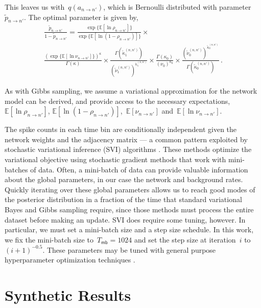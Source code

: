 This leaves us with~$q(a_{n \to n'})$, which is Bernoulli distributed
with parameter~$\widetilde{p}_{n \to n'}$. The optimal parameter is given by,
\begin{multline*}
  \frac{\widetilde{p}_{n \to n'}}{1-\widetilde{p}_{n \to n'}} =  
  \frac{\exp\{\mathbb{E} [\ln \rho_{n \to n'}] \} }{\exp\{\mathbb{E}[\ln (1-\rho_{n \to n'})] \}} \times \\
  \frac{ (\exp\{\mathbb{E} [\ln \nu_{n \to n'}] \})^{\kappa} }{ \Gamma(\kappa)} \times 
  \frac{\Gamma(\widetilde{\kappa}^{(n,n')}_1)}{ (\widetilde{\nu}^{(n,n')}_1)^{\widetilde{\kappa}^{(n,n')}_1} } \times
  \frac{\Gamma(\kappa_0)}{ (\nu_0)^{\kappa_0} } \times
  \frac{(\widetilde{\nu}^{(n,n')}_0)^{\widetilde{\kappa}^{(n,n')}_0}}{ \Gamma(\widetilde{\kappa}^{(n,n')}_0)}\,.
\end{multline*}

As with Gibbs sampling, we assume a variational approximation for the
network model can be derived, and provide access to the necessary
expectations,~$\mathbb{E}[\ln \rho_{n \to n'}]$,
$\mathbb{E}[\ln(1-\rho_{n \to n'})]$,~$\mathbb{E}[\nu_{n \to n'}]$ and~$\mathbb{E}[\ln \nu_{n \to n'}]$.

The spike counts in each time bin are conditionally independent given
the network weights and the adjacency matrix --- a common pattern
exploited by stochastic variational inference (SVI) algorithms
\citep{Hoffman-2013}.  These methods optimize the variational objective
using stochastic gradient methods that work with mini-batches of data.
Often, a mini-batch of data can provide valuable information about the
global parameters, in our case the network and background rates.
Quickly iterating over these global parameters allows us to reach good
modes of the posterior distribution in a fraction of the time that
standard variational Bayes and Gibbs sampling require, since those
methods must process the entire dataset before making an update.  SVI
does require some tuning, however. In particular, we must set a
mini-batch size and a step size schedule.  In this work, we fix the
mini-batch size to~${T_{\mathsf{mb}}=1024}$ and set the step size at
iteration~$i$ to~${(i+1)^{-0.5}}$.  These parameters may be tuned with
general purpose hyperparameter optimization techniques
\citep{Snoek-2012}.

\section{Synthetic Results}

